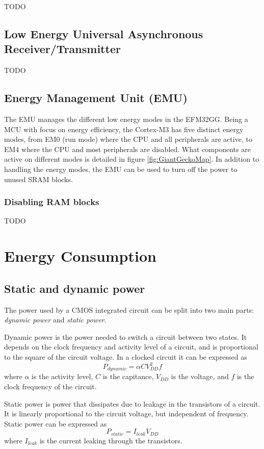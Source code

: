 TODO %


\subsection{Low Energy Universal Asynchronous Receiver/Transmitter}\label{subsec:leuart}
TODO %


\subsection{Energy Management Unit (EMU)}\label{sec:emu}
The EMU manages the different low energy modes in the EFM32GG. Being a MCU with focus on energy efficiency, the Cortex-M3 has five distinct energy modes, from EM0 (run mode) where the CPU and all peripherals are active, to EM4 where the CPU and most peripherals are disabled. What components are active on different modes is detailed in figure \ref{fig:GiantGeckoMap}. In addition to handling the energy modes, the EMU can be used to turn off the power to unused SRAM blocks.\cite{efm32gg-rm}

\subsubsection{Disabling RAM blocks}
TODO %



\section{Energy Consumption}

\subsection{Static and dynamic power}
The power used by a CMOS integrated circuit can be split into two main parts: \emph{dynamic power} and \emph{static power}. 

Dynamic power is the power needed to switch a circuit between two states. It depends on the clock frequency and activity level of a circuit, and is proportional to the square of the circuit voltage. In a clocked circuit it can be expressed as
$$P_{dynamic} = \alpha CV_{DD}^{2}f$$
where $\alpha$ is the activity level, $C$ is the capitance, $V_{DD}$ is the voltage, and $f$ is the clock frequency of the circuit.

Static power is power that dissipates due to leakage in the transistors of a circuit. It is linearly proportional to the circuit voltage, but independent of frequency. Static power can be expressed as
$$P_{static} = I_{leak}V_{DD}$$
where $I_{leak}$ is the current leaking through the transistors.

